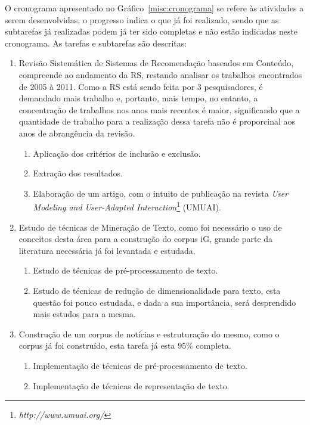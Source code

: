 \documentclass[normaltoc, espacoumemeio, pnumromarab,ruledheader]{abnt}
\begin{document}
O cronograma apresentado no Gráfico~\ref{misc:cronograma} se refere às atividades a serem desenvolvidas, o progresso indica o que já foi realizado, sendo que as subtarefas já realizadas podem já ter sido completas e não estão indicadas neste cronograma. As tarefas e subtarefas são descritas:
\begin{enumerate}
  \item[{\texttt{[1]}}] Revisão Sistemática de Sistemas de Recomendação baseados em Conteúdo, compreende ao andamento da RS, restando analisar os trabalhos encontrados de 2005 à 2011. Como a RS está sendo feita por 3 pesquisadores, é demandado mais trabalho e, portanto, mais tempo, no entanto, a concentração de trabalhos nos anos mais recentes é maior, significando que a quantidade de trabalho para a realização dessa tarefa não é proporcinal aos anos de abrangência da revisão.
  \begin{enumerate}
    \item[{\texttt{[1.1]}}] Aplicação dos critérios de inclusão e exclusão.
    \item[{\texttt{[1.2]}}] Extração dos resultados.
    \item[{\texttt{[1.3]}}] Elaboração de um artigo, com o intuito de publicação na revista \textit{User Modeling and User-Adapted Interaction}\footnote{\textit{http://www.umuai.org/}} (UMUAI).
  \end{enumerate}
  \item[{\texttt{[2]}}] Estudo de técnicas de Mineração de Texto, como foi necessário o uso de conceitos desta área para a construção do corpus iG, grande parte da literatura necessária já foi levantada e estudada.
  \begin{enumerate}
    \item[{\texttt{[2.1]}}] Estudo de técnicas de pré-processamento de texto.
    \item[{\texttt{[2.2]}}] Estudo de técnicas de redução de dimensionalidade para texto, esta questão foi pouco estudada, e dada a sua importância, será desprendido mais estudos para a mesma.
  \end{enumerate}
  \item[{\texttt{[4]}}] Construção de um corpus de notícias e estruturação do mesmo, como o corpus já foi construído, esta tarefa já esta $95\%$ completa.
  \begin{enumerate}
    \item[{\texttt{[3.1]}}] Implementação de técnicas de pré-processamento de texto.
    \item[{\texttt{[3.2]}}] Implementação de técnicas de representação de texto.

\end{enumerate}
\end{enumerate}
\end{document}
